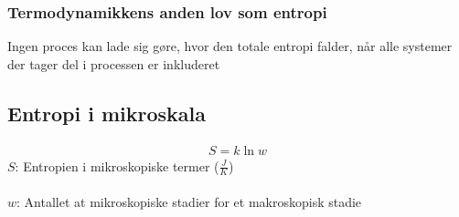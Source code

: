 	\subsubsection{Termodynamikkens anden lov som entropi}
		Ingen proces kan lade sig gøre, hvor den totale entropi falder, når alle systemer der tager del i processen er inkluderet
	
\subsection{Entropi i mikroskala}
	\begin{align}
		S=k\ln w
	\end{align}
	$S$: Entropien i mikroskopiske termer ($\frac{J}{K}$)\\
	\boltzkonst\\
	$w$: Antallet at mikroskopiske stadier for et makroskopisk stadie